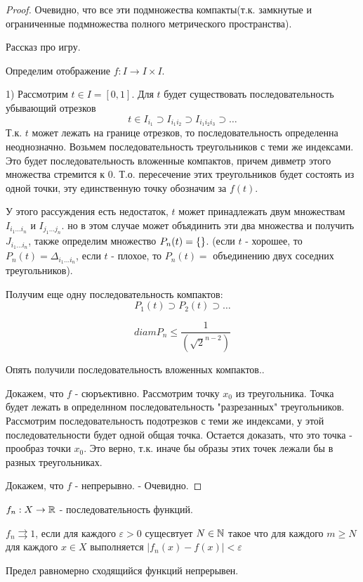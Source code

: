 \begin{proof}
    Очевидно, что все эти подмножества компакты(т.к. замкнутые и ограниченные подмножества полного метрического пространства).

    \begin{nota_bene}
        Рассказ про игру.
    \end{nota_bene}

    Определим отображение $f: I \rightarrow I \times I$.

    1) Рассмотрим $t \in I = [0, 1]$. Для $t$ будет существовать последовательность убывающий отрезков
    \[
        t \in I_{i_1} \supset I_{i_1 i_2} \supset I_{i_1 i_2 i_3} \supset \ldots
    \]
    Т.к. $t$ может лежать на границе отрезков, то последовательность определенна неоднозначно.
    Возьмем последовательность треугольников с теми же индексами. Это будет последовательность вложенные компактов, причем дивметр этого множества стремится к $0$. Т.о. пересечение этих треугольников будет состоять из одной точки, эту единственную точку обозначим за $f(t)$.

    У этого рассуждения есть недостаток, $t$ может принадлежать двум множествам $I_{i_1 \ldots i_n}$ и $I_{j_1 \ldots j_n}$. но в этом случае может объядинить эти два множества и получить $J_{i_1 \ldots i_n}$, также определим множество $P_n(t) = \left\{\right\}$. (если $t$ - хорошее, то $P_n(t) = \Delta_{i_1 \ldots i_n}$, если $t$ - плохое, то $P_n(t) = $ объединению двух соседних треугольников). 

    Получим еще одну последовательность компактов:
    \[
        P_1(t) \supset P_2(t) \supset \ldots
    \]

    \begin{statement}
        \[
            diam P_n \leq \frac{1}{(\sqrt{2}^{n - 2})}
        \]
    \end{statement}
    Опять получили последовательность вложенных компактов..


    Докажем, что $f$ - сюръективно. 
    Рассмотрим точку $x_0$ из треугольника. Точка будет лежать в определнном последовательность "разрезанных" треугольников. Рассмотрим последовательность подотрезков с теми же индексами, у этой последовательности будет одной общая точка. Остается доказать, что это точка - прообраз точки $x_0$. Это верно, т.к. иначе бы образы этих точек лежали бы в разных треугольниках.

    Докажем, что $f$ - непрерывно. - Очевидно.
\end{proof}

\begin{definition}
    $f_n : X \rightarrow \mathbb{R}$ - последовательность функций.

    $f_n \rightrightarrows 1$, если для каждого $\varepsilon > 0$ сущесвтует $N \in \mathbb{N}$ такое что для каждого $m \geq N$ для каждого $x \in X$ выполняется $|f_n(x) - f(x)| < \varepsilon$
\end{definition}

\begin{theorem}
    Предел равномерно сходящийся функций непрерывен.
\end{theorem}
